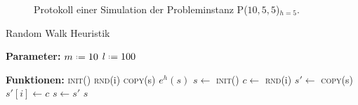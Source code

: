 %
%
\begin{figure}
\centering
\begin{minipage}{\textwidth}
  
\end{minipage}
\caption[\textsf{P($10,5,5$)$_{h=5}$} (Simulationsprotokoll)]{Protokoll einer Simulation der Probleminstanz \textsf{P($10,5,5$)$_{h=5}$}.}
\label{fig:app-h005-0.log}
\end{figure}
%
%
\begin{algorithm}
  \caption{Random Walk Heuristik}\label{alg:rw}
  \begin{algorithmic}[1]
    \item[\textbf{Parameter:}]
    \Statex $m \defeq 10$ 
    \Statex $l \defeq 100$ 
    \Statex
    \item[\textbf{Funktionen:}]
    \Statex \textsc{init}() 
    \Statex \textsc{rnd}(i) 
    \Statex \textsc{copy}(s) 
    \Statex $e^h(s)$ 
    \Statex
    \State $s \gets$ \textsc{init}()
        \State $c \gets$ \textsc{rnd}(i) 
        \State $s' \gets$ \textsc{copy}(s)
        \State $s'[i] \gets c$
         
          \State $s \gets s'$ 
        \EndIf
      \EndFor
    \EndFor
    \State \Return $s$ 
  \end{algorithmic}
\end{algorithm}
%
%
%
\ifx\fulldocument\undefined
  
\fi